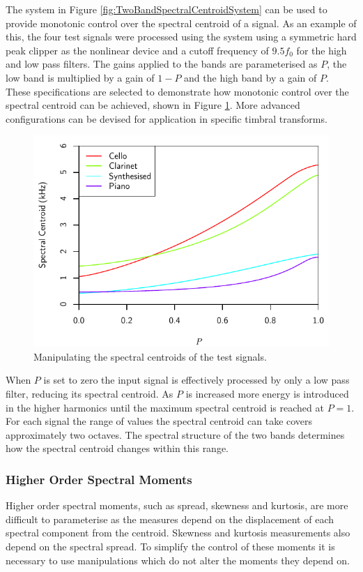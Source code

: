 			The system in Figure \ref{fig:TwoBandSpectralCentroidSystem} can be used to provide monotonic
			control over the spectral centroid of a signal. As an example of this, the four test signals were
			processed using the system using a symmetric hard peak clipper as the nonlinear device and a cutoff
			frequency of $9.5f_{0}$ for the high and low pass filters. The gains applied to the bands are
			parameterised as $P$, the low band is multiplied by a gain of $1 - P$ and the high band by a gain
			of $P$. These specifications are selected to demonstrate how monotonic control over the spectral
			centroid can be achieved, shown in Figure \ref{fig:MoveCentroids}. More advanced configurations can
			be devised for application in specific timbral transforms.

			\begin{figure}[h!]
				\centering
				\includegraphics{chapter6/Images/MoveCentroids.pdf}
				\caption{Manipulating the spectral centroids of the test signals.}
				\label{fig:MoveCentroids}
			\end{figure}

			When $P$ is set to zero the input signal is effectively processed by only a low pass filter,
			reducing its spectral centroid. As $P$ is increased more energy is introduced in the higher
			harmonics until the maximum spectral centroid is reached at $P = 1$. For each signal the range of
			values the spectral centroid can take covers approximately two octaves. The spectral structure of
			the two bands determines how the spectral centroid changes within this range.

		\subsubsection*{Higher Order Spectral Moments}
			Higher order spectral moments, such as spread, skewness and kurtosis, are more difficult to
			parameterise as the measures depend on the displacement of each spectral component from the
			centroid. Skewness and kurtosis measurements also depend on the spectral spread. To simplify the
			control of these moments it is necessary to use manipulations which do not alter the moments they
			depend on. 
			
